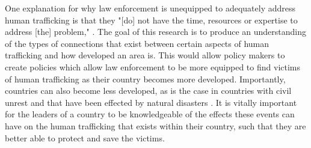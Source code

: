 \documentclass{article} %
\begin{document}
One explanation for why law enforcement is unequipped to adequately address human trafficking is that they "[do] not have the time, resources or expertise to address [the] problem," \parencite{LawResponse}. The goal of this research is to produce an understanding of the types of connections that exist between certain aspects of human trafficking and how developed an area is. This would allow policy makers to create policies which allow law enforcement to be more equipped to find victims of human trafficking as their country becomes more developed. Importantly, countries can also become less developed, as is the case in countries with civil unrest and that have been effected by natural disasters \parencite{bar2010}. It is vitally important for the leaders of a country to be knowledgeable of the effects these events can have on the human trafficking that exists within their country, such that they are better able to protect and save the victims.


\printbibliography
\end{document}
